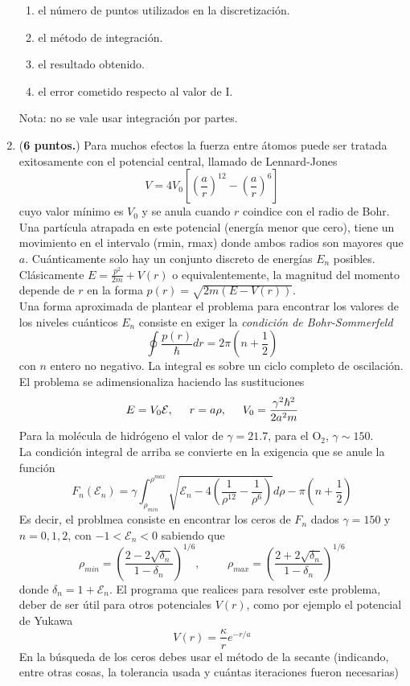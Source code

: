 \documentclass[11pt]{article}
\begin{document}
\begin{enumerate}
\begin{enumerate}
		\item el n\'{u}mero de puntos utilizados en la discretizaci\'{o}n.
		\item el m\'{e}todo de integraci\'{o}n.
		\item el resultado obtenido.
		\item el error cometido respecto al valor de I.
	\end{enumerate}
	Nota: no se vale usar integraci\'{o}n por partes.
	\item (\textbf{6 puntos.}) Para muchos efectos la fuerza entre \'{a}tomos puede ser tratada exitosamente con el potencial central, llamado de Lennard-Jones
	\[ V = 4 V_{0} \left[ \left( \dfrac{a}{r} \right)^{12} - \left( \dfrac{a}{r} \right)^{6} \right] \]
	cuyo valor m\'{i}nimo es $V_{0}$ y se anula cuando $r$ coindice con el radio de Bohr. Una part\'{i}cula atrapada en este potencial (energ\'{i}a menor que cero), tiene un movimiento en el intervalo (rmin, rmax) donde ambos radios son
mayores que $a$. Cu\'{a}nticamente solo hay un conjunto discreto de energ\'{i}as $E_{n}$ posibles. Cl\'{a}sicamente $E= \frac{p^{2}}{2m}+ V(r)$ o equivalentemente, la magnitud del momento depende de $r$ en la forma $p(r) = \sqrt{2m(E-V(r))}$.
	\\
	Una forma aproximada de plantear el problema para encontrar los valores de los niveles cu\'{a}nticos $E_{n}$ consiste en exiger la \textit{condici\'{o}n de Bohr-Sommerfeld}
	\[ \oint \dfrac{p(r)}{\hbar} dr = 2 \pi \left( n + \dfrac{1}{2} \right) \]
	con $n$ entero no negativo. La integral es sobre un ciclo completo de oscilaci\'{o}n. El problema se adimensionaliza haciendo las sustituciones
	\[ E = V_{0} \mathcal{E}, \hspace{0.5cm} r = a \rho, \hspace{0.5cm} V_{0} = \dfrac{\gamma^{2} \hbar^{2}}{2 a^{2} m}\]
	Para la mol\'{e}cula de hidr\'{o}geno el valor de $\gamma=21.7$, para el O$_{2}$, $\gamma \sim 150$.
	\\
	La condici\'{o}n integral de arriba se convierte en la exigencia que se anule la funci\'{o}n
	\[ F_{n}(\mathcal{E}_{n}) = \gamma  \int_{\rho_{min}}^{\rho^{max}} \sqrt{\mathcal{E}_{n} - 4 \left( \dfrac{1}{\rho^{12}} - \dfrac{1}{\rho^{6}} \right)} d\rho - \pi \left( n + \dfrac{1}{2} \right) \]
	Es decir, el problmea consiste en encontrar los ceros de $F_{n}$ dados $\gamma=150$ y $n=0,1,2$, con $-1<\mathcal{E}_{n} < 0$ sabiendo que
	\[ \rho_{min} = \left( \dfrac{2-2\sqrt{\delta_{n}}}{1-\delta_{n}} \right)^{1/6}, \hspace{1cm}  \rho_{max} = \left( \dfrac{2+2\sqrt{\delta_{n}}}{1-\delta_{n}} \right)^{1/6}\]
	donde $\delta_{n} = 1 + \mathcal{E}_{n}$.
	El programa que realices para resolver este problema, deber de ser \'{u}til para otros potenciales $V(r)$, como por ejemplo el potencial de Yukawa
	\[ V(r) = \dfrac{\kappa}{r} e^{-r/a}\]
	En la b\'{u}squeda de los ceros debes usar el m\'{e}todo de la secante (indicando, entre otras cosas, la tolerancia usada y cu\'{a}ntas iteraciones fueron necesarias)
\end{enumerate}
\end{document}
